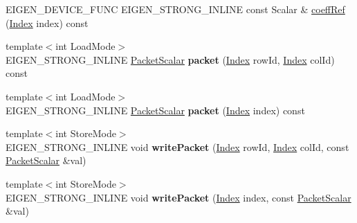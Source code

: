 \begin{DoxyCompactItemize}
\item 
E\+I\+G\+E\+N\+\_\+\+D\+E\+V\+I\+C\+E\+\_\+\+F\+U\+NC E\+I\+G\+E\+N\+\_\+\+S\+T\+R\+O\+N\+G\+\_\+\+I\+N\+L\+I\+NE const Scalar \& \hyperlink{class_eigen_1_1_plain_object_base_a982b56223d011e2f836a3408983883d4}{coeff\+Ref} (\hyperlink{namespace_eigen_a62e77e0933482dafde8fe197d9a2cfde}{Index} index) const
\item 
\mbox{\label{class_eigen_1_1_plain_object_base_a85d505b93c18f4f558e9b80702e8e5af}} 
{\footnotesize template$<$int Load\+Mode$>$ }\\E\+I\+G\+E\+N\+\_\+\+S\+T\+R\+O\+N\+G\+\_\+\+I\+N\+L\+I\+NE \hyperlink{group___sparse_core___module}{Packet\+Scalar} {\bfseries packet} (\hyperlink{namespace_eigen_a62e77e0933482dafde8fe197d9a2cfde}{Index} row\+Id, \hyperlink{namespace_eigen_a62e77e0933482dafde8fe197d9a2cfde}{Index} col\+Id) const
\item 
\mbox{\label{class_eigen_1_1_plain_object_base_afdf71b005e354b8407b53dfd8aa7add2}} 
{\footnotesize template$<$int Load\+Mode$>$ }\\E\+I\+G\+E\+N\+\_\+\+S\+T\+R\+O\+N\+G\+\_\+\+I\+N\+L\+I\+NE \hyperlink{group___sparse_core___module}{Packet\+Scalar} {\bfseries packet} (\hyperlink{namespace_eigen_a62e77e0933482dafde8fe197d9a2cfde}{Index} index) const
\item 
\mbox{\label{class_eigen_1_1_plain_object_base_adb237a2cdcb37c6901ad15c7a9d87b1a}} 
{\footnotesize template$<$int Store\+Mode$>$ }\\E\+I\+G\+E\+N\+\_\+\+S\+T\+R\+O\+N\+G\+\_\+\+I\+N\+L\+I\+NE void {\bfseries write\+Packet} (\hyperlink{namespace_eigen_a62e77e0933482dafde8fe197d9a2cfde}{Index} row\+Id, \hyperlink{namespace_eigen_a62e77e0933482dafde8fe197d9a2cfde}{Index} col\+Id, const \hyperlink{group___sparse_core___module}{Packet\+Scalar} \&val)
\item 
\mbox{\label{class_eigen_1_1_plain_object_base_acda1c761dd92774f7835a0c661f2ef54}} 
{\footnotesize template$<$int Store\+Mode$>$ }\\E\+I\+G\+E\+N\+\_\+\+S\+T\+R\+O\+N\+G\+\_\+\+I\+N\+L\+I\+NE void {\bfseries write\+Packet} (\hyperlink{namespace_eigen_a62e77e0933482dafde8fe197d9a2cfde}{Index} index, const \hyperlink{group___sparse_core___module}{Packet\+Scalar} \&val)

\end{DoxyCompactItemize}
